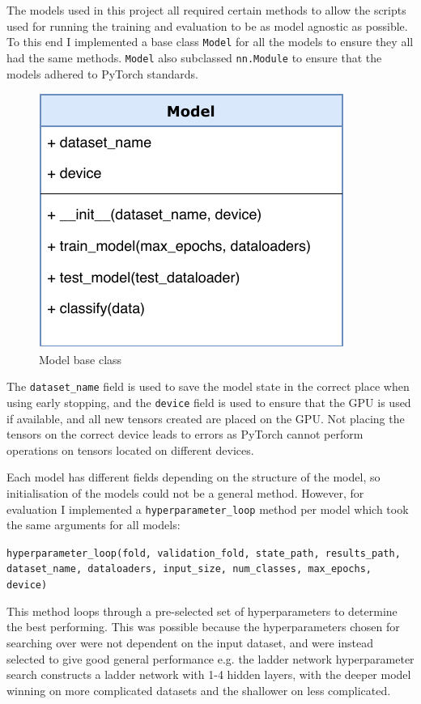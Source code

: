 \documentclass[12pt,a4paper,twoside,openright]{report}
\begin{document}
The models used in this project all required certain methods to allow the scripts used for running the training and evaluation to be as 
model agnostic as possible. To this end I implemented a base class \texttt{Model} for all the models to ensure they all had the same methods.
\texttt{Model} also subclassed \texttt{nn.Module} to ensure that the models adhered to PyTorch standards.
\begin{figure}[H]
  \centering
  \includegraphics[scale=1]{figs/model_class.pdf}
  \caption{Model base class}
\end{figure}

The \texttt{dataset\_name} field is used to save the model state in the correct place when using early stopping, and the \texttt{device} field is 
used to ensure that the GPU is used if available, and all new tensors created are placed on the GPU. Not placing the tensors on the correct device 
leads to errors as PyTorch cannot perform operations on tensors located on different devices.

Each model has different fields depending on the structure of the model, so initialisation of the models could not be a general method. 
However, for evaluation I implemented a \texttt{hyperparameter\_loop} method per model 
which took the same arguments for all models:
\begin{center}
  \texttt{hyperparameter\_loop(fold, validation\_fold, state\_path, results\_path, dataset\_name, dataloaders, input\_size, num\_classes, max\_epochs, device)}
\end{center}

This method loops through a pre-selected set of hyperparameters to determine the best performing.
This was possible because the hyperparameters chosen for searching over were not dependent on the input dataset, and were instead selected 
to give good general performance e.g. the ladder network hyperparameter search constructs a ladder network with 1-4 hidden layers, with the 
deeper model winning on more complicated datasets and the shallower on less complicated.
\end{document}
